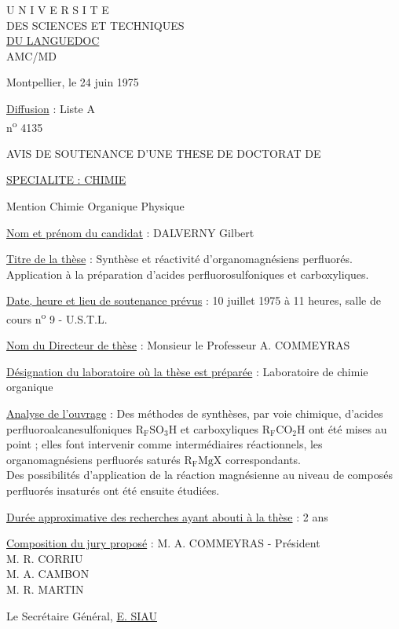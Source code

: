 U N I V E R S I T E\\
DES SCIENCES ET TECHNIQUES\\
\uline{DU LANGUEDOC}\\
AMC/MD

Montpellier, le 24 juin 1975

\uline{Diffusion} : Liste A\\
n\textsuperscript{o} 4135

AVIS DE SOUTENANCE D'UNE THESE DE DOCTORAT DE

\uline{SPECIALITE : CHIMIE}

Mention Chimie Organique Physique

\uline{Nom et prénom du candidat} : DALVERNY Gilbert

\uline{Titre de la thèse} : Synthèse et réactivité d'organomagnésiens perfluorés.
Application à la préparation d'acides perfluorosulfoniques et carboxyliques.

\uline{Date, heure et lieu de soutenance prévus} : 10 juillet 1975 à 11 heures, salle
de cours n\textsuperscript{o} 9 - U.S.T.L.

\uline{Nom du Directeur de thèse} : Monsieur le Professeur A. COMMEYRAS

\uline{Désignation du laboratoire où la thèse est préparée} : Laboratoire de chimie organique

\uline{Analyse de l'ouvrage} : Des méthodes de synthèses, par voie chimique, d'acides
perfluoroalcanesulfoniques \(\mathrm{R_FSO_3H}\) et carboxyliques \(\mathrm{R_FCO_2H}\)
ont été mises au point ; elles font intervenir comme intermédiaires réactionnels, les
organomagnésiens perfluorés saturés \(\mathrm{R_FMgX}\) correspondants.\\
Des possibilités d'application de la réaction magnésienne au niveau de composés
perfluorés insaturés ont été ensuite étudiées.

\uline{Durée approximative des recherches ayant abouti à la thèse} : 2 ans

\uline{Composition du jury proposé} : M. A. COMMEYRAS - Président\\
M. R. CORRIU\\
M. A. CAMBON\\
M. R. MARTIN

Le Secrétaire Général,
\uline{E. SIAU}
